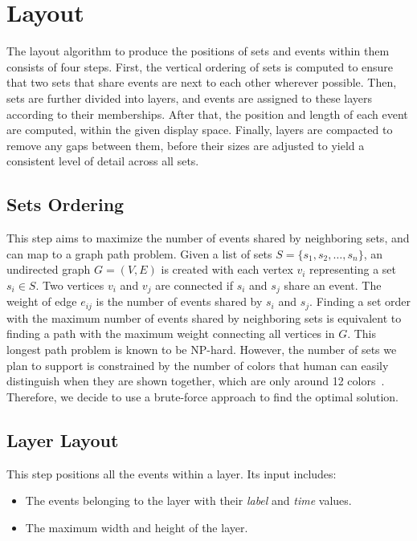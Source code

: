 \section{Layout}
\label{sec:ts-algorithm}
The layout algorithm to produce the positions of sets and events within them consists of four steps. First, the vertical ordering of sets is computed to ensure that two sets that share events are next to each other wherever possible. Then, sets are further divided into layers, and events are assigned to these layers according to their memberships. After that, the position and length of each event are computed, within the given display space. Finally, layers are compacted to remove any gaps between them, before their sizes are adjusted to yield a consistent level of detail across all sets.

\subsection{Sets Ordering}
\label{sec:set-ordering}
This step aims to maximize the number of events shared by neighboring sets, and can map to a graph path problem. Given a list of sets $S=\{s_1, s_2, \dotsc, s_n\}$, an undirected graph $G = (V,E)$ is created with each vertex $v_i$ representing a set $s_i \in S$. Two vertices $v_i$ and $v_j$ are connected if $s_i$ and $s_j$ share an event. The weight of edge $e_{ij}$ is the number of events shared by $s_i$ and $s_j$. Finding a set order with the maximum number of events shared by neighboring sets is equivalent to finding a path with the maximum weight connecting all vertices in $G$. This longest path problem is known to be NP-hard. However, the number of sets we plan to support is constrained by the number of colors that human can easily distinguish when they are shown together, which are only around 12 colors~\cite{Munzner2014}. Therefore, we decide to use a brute-force approach to find the optimal solution.

\subsection{Layer Layout}
This step positions all the events within a layer. Its input includes:
\begin{itemize}
	\item The events belonging to the layer with their \emph{label} and \emph{time} values.
	\item The maximum width and height of the layer.
\end{itemize}

